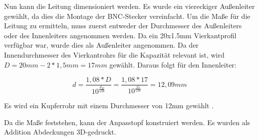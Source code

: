 Nun kann die Leitung dimensioniert werden. Es wurde ein viereckiger Außenleiter gewählt, da dies die Montage der BNC-Stecker vereinfacht. Um die Maße für die Leitung zu ermitteln, muss zuerst entweder der Durchmesser des Außenleiters oder des Innenleiters angenommen werden. Da ein 20x1.5mm Vierkantprofil verfügbar war, wurde dies als Außenleiter angenommen. Da der Innendurchmesser des Vierkantrohrs für die Kapazität relevant ist, wird $D=20mm-2*1,5mm=17mm$ gewählt. Daraus folgt für den Innenleiter:

\begin{equation}
	d=\frac{1,08*D}{10^{\frac{Z_W}{138}}}=\frac{1,08*17}{10^{\frac{25}{138}}}=12,09mm
\end{equation}


Es wird ein Kupferrohr mit einem Durchmesser von 12mm gewählt \cite{admin_lambda4_2016}.

Da die Maße feststehen, kann der Anpasstopf konstruiert werden. Es wurden als Addition Abdeckungen 3D-gedruckt.

